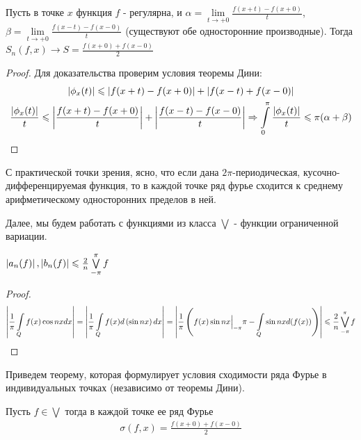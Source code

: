 \begin{corollary}
	Пусть в точке $x$ функция $f$ - регулярна, и 
	$\alpha = \lim\limits_{t\rightarrow +0}\frac{f(x + t) - f(x + 0)}{t}$,
	$\beta = \lim\limits_{t\rightarrow +0}\frac{f(x - t) - f(x - 0)}{t}$
	(существуют обе односторонние производные).
	Тогда $S_n(f, x) \rightarrow S = \frac{f(x + 0) + f(x - 0)}{2}$
\end{corollary}
	
\begin{proof}
	Для доказательства проверим условия теоремы Дини:
	\begin{gather*}
		\left|\phi_x(t)\right| \leqslant \left|f(x + t) - f(x + 0)\right| + \left|f(x - t) + f(x - 0)\right|\\
		\frac{\left|\phi_x(t)\right|}{t} \leqslant \left|\frac{f(x + t) - f(x + 0)}{t}\right| + 
		\left|\frac{f(x - t) - f(x - 0)}{t}\right|\Rightarrow
		\int\limits_{0}^{\pi} \frac{\left|\phi_x(t)\right|}{t} \leqslant \pi(\alpha + \beta)
	\end{gather*}
\end{proof}


С практической точки зрения, ясно, что если дана $2\pi$-периодическая, 
кусочно-дифференцируемая функция, то в каждой точке 
ряд фурье сходится к среднему арифметическому односторонних пределов в ней.

Далее, мы будем работать с функциями из класса $\bigvee$ - функции ограниченной вариации.
\begin{statement}
	$\left|a_n(f)\right|, \left|b_n(f)\right| \leqslant \frac{2}{n}\bigvee\limits_{-\pi}^{\pi} f$
\end{statement}

\begin{proof}
	\begin{gather*}
		\left|\frac{1}{\pi}\int\limits_{Q}f(x)\cos nx dx\right| = 
		\left|\frac{1}{\pi}\int\limits_{Q} f(x) d\left(\sin nx \right)dx \right| =
		\left|\frac{1}{\pi} \left( f(x) \sin nx \Big|_{-\pi}{\pi} - 
		\int\limits_{Q} \sin nx d( f(x))\right)\right| \leqslant \frac{2}{n}\bigvee\limits_{-\pi}^{\pi} f
	\end{gather*}
\end{proof}

Приведем теорему, которая формулирует условия сходимости ряда Фурье в индивидуальных точках 
(независимо от теоремы Дини).

\begin{theorem}
	Пусть $f \in \bigvee$ тогда в каждой точке ее ряд Фурье 
	\begin{gather*}
		\sigma(f,x) = \frac{f(x + 0) + f(x - 0)}{2}
	\end{gather*}
\end{theorem}

